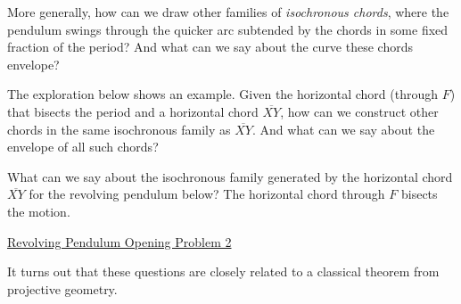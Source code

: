 \documentclass{ximera}
\begin{document}



More generally, how can we draw other families of \emph{isochronous chords}, where the pendulum swings through the quicker arc subtended by the chords in some fixed fraction of the period?  And what can we say about the curve these chords envelope?

The exploration below shows an example. Given the horizontal chord (through $F$) that bisects the period and a horizontal chord $\overline{XY}$, how can we construct other chords in the same isochronous family as $\overline{XY}$. And what can we say about the envelope of all such chords?




\begin{exploration}
What can we say about the isochronous family generated by the horizontal chord $\overline{XY}$ for the revolving pendulum below? The horizontal chord through $F$ bisects the motion.

\begin{onlineOnly}
    \begin{center}
\end{center}
\end{onlineOnly}

\href{https://www.desmos.com/calculator/1kyfdn6yyc}{Revolving Pendulum Opening Problem 2}

\end{exploration}

It turns out that these questions are closely related to a classical theorem from projective geometry. %
\end{document}
